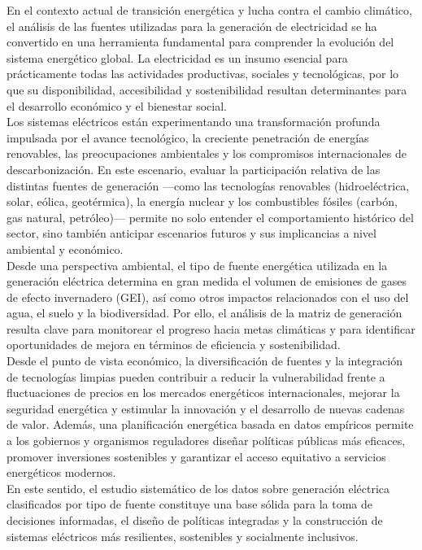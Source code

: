 \documentclass{article}
\begin{document}
En el contexto actual de transición energética y lucha contra el cambio climático, el análisis de las fuentes utilizadas para la generación de electricidad se ha convertido en una herramienta fundamental para comprender la evolución del sistema energético global. La electricidad es un insumo esencial para prácticamente todas las actividades productivas, sociales y tecnológicas, por lo que su disponibilidad, accesibilidad y sostenibilidad resultan determinantes para el desarrollo económico y el bienestar social.\\

Los sistemas eléctricos están experimentando una transformación profunda impulsada por el avance tecnológico, la creciente penetración de energías renovables, las preocupaciones ambientales y los compromisos internacionales de descarbonización. En este escenario, evaluar la participación relativa de las distintas fuentes de generación —como las tecnologías renovables (hidroeléctrica, solar, eólica, geotérmica), la energía nuclear y los combustibles fósiles (carbón, gas natural, petróleo)— permite no solo entender el comportamiento histórico del sector, sino también anticipar escenarios futuros y sus implicancias a nivel ambiental y económico.\\

Desde una perspectiva ambiental, el tipo de fuente energética utilizada en la generación eléctrica determina en gran medida el volumen de emisiones de gases de efecto invernadero (GEI), así como otros impactos relacionados con el uso del agua, el suelo y la biodiversidad. Por ello, el análisis de la matriz de generación resulta clave para monitorear el progreso hacia metas climáticas y para identificar oportunidades de mejora en términos de eficiencia y sostenibilidad.\\

Desde el punto de vista económico, la diversificación de fuentes y la integración de tecnologías limpias pueden contribuir a reducir la vulnerabilidad frente a fluctuaciones de precios en los mercados energéticos internacionales, mejorar la seguridad energética y estimular la innovación y el desarrollo de nuevas cadenas de valor. Además, una planificación energética basada en datos empíricos permite a los gobiernos y organismos reguladores diseñar políticas públicas más eficaces, promover inversiones sostenibles y garantizar el acceso equitativo a servicios energéticos modernos.\\

En este sentido, el estudio sistemático de los datos sobre generación eléctrica clasificados por tipo de fuente constituye una base sólida para la toma de decisiones informadas, el diseño de políticas integradas y la construcción de sistemas eléctricos más resilientes, sostenibles y socialmente inclusivos.\\
\end{document}
